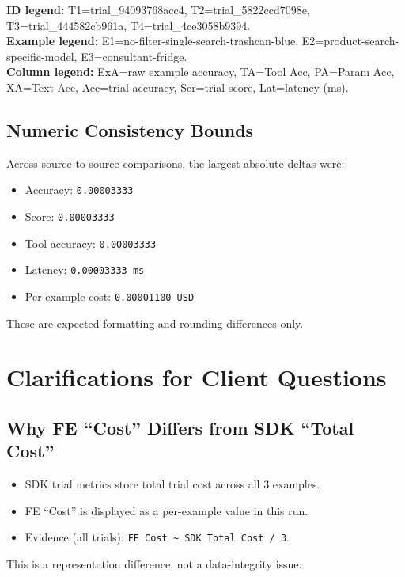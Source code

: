 \documentclass[11pt]{article}
\begin{document}
\vspace{-0.6em}
{\footnotesize
\textbf{ID legend:} T1=trial\_94093768acc4, T2=trial\_5822ccd7098e, T3=trial\_444582cb961a, T4=trial\_4ce3058b9394.\\
\textbf{Example legend:} E1=no-filter-single-search-trashcan-blue, E2=product-search-specific-model, E3=consultant-fridge.\\
\textbf{Column legend:} ExA=raw example accuracy, TA=Tool Acc, PA=Param Acc, XA=Text Acc, Acc=trial accuracy, Scr=trial score, Lat=latency (ms).
}
\normalsize

\subsection{Numeric Consistency Bounds}

Across source-to-source comparisons, the largest absolute deltas were:
\begin{itemize}
    \item Accuracy: \texttt{0.00003333}
    \item Score: \texttt{0.00003333}
    \item Tool accuracy: \texttt{0.00003333}
    \item Latency: \texttt{0.00003333 ms}
    \item Per-example cost: \texttt{0.00001100 USD}
\end{itemize}

These are expected formatting and rounding differences only.

\section{Clarifications for Client Questions}

\subsection{Why FE ``Cost'' Differs from SDK ``Total Cost''}

\begin{itemize}
    \item SDK trial metrics store total trial cost across all 3 examples.
    \item FE ``Cost'' is displayed as a per-example value in this run.
    \item Evidence (all trials): \texttt{FE Cost \textasciitilde{} SDK Total Cost / 3}.
\end{itemize}

This is a representation difference, not a data-integrity issue.
\end{document}
